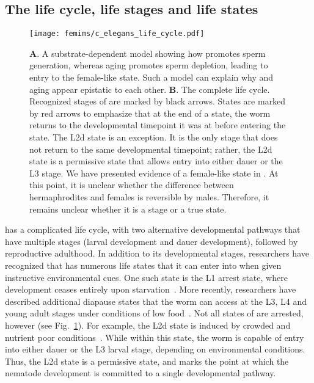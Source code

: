 \subsection*{The \cel{} life cycle, life stages and life states}

\begin{figure}
  \renewcommand{\familydefault}{\sfdefault}\normalfont{}
  \centering
  \texttt{[image: femims/c\_elegans\_life\_cycle.pdf]}
  \caption{
    \textbf{A}. A substrate-dependent model showing how  promotes sperm
    generation, whereas aging promotes sperm depletion, leading to entry to the
    female-like state. Such a model can explain why  and aging appear
    epistatic to each other.
    \textbf{B}. The complete \cel{} life cycle.
    Recognized stages of \cel{} are marked by black arrows. States are marked by
    red arrows to emphasize that at the end of a state, the worm returns to the
    developmental timepoint it was at before entering the state. The L2d state
    is an exception. It is the only stage that does not return to the same
    developmental timepoint; rather, the L2d state is a permissive state that
    allows entry into either dauer or the L3 stage. We have presented evidence
    of a female-like state in \cel{}. At this point, it is unclear whether the
    difference between hermaphrodites and females is reversible by males.
    Therefore, it remains unclear whether it is a stage or a true state.
  }%
\label{fig:lifecycle}
\end{figure}

\cel{} has a complicated life cycle, with two alternative developmental pathways
that have multiple stages (larval development and dauer development), followed
by reproductive adulthood. In addition to its developmental stages, researchers
have recognized that \cel{} has numerous life states that it can enter into when
given instructive environmental cues. One such state is the L1 arrest state,
where development ceases entirely upon starvation~\citep{Johnson1984,Baugh2006}.
More
recently, researchers have described additional diapause states that the worm
can access at the L3, L4 and young adult stages under conditions of low
food~\citep{Angelo2009,Seidel2011,Schindler2014}. Not all states of \cel{} are
arrested, however (see Fig.~\ref{fig:lifecycle}). For example, the L2d state is
induced by crowded and nutrient poor conditions~\citep{Golden1984}. While within
this state, the worm is capable of entry into either dauer or the L3 larval
stage, depending on environmental conditions. Thus, the L2d state is a
permissive state, and marks the point at which the nematode development is
committed to a single developmental pathway.

